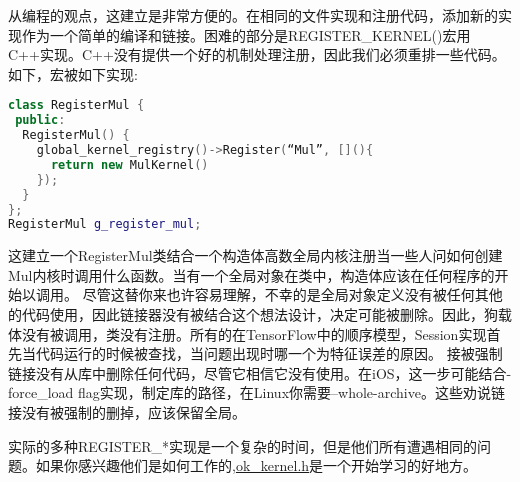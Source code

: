 从编程的观点，这建立是非常方便的。在相同的文件实现和注册代码，添加新的实现作为一个简单的编译和链接。困难的部分是REGISTER\_KERNEL()宏用C++实现。C++没有提供一个好的机制处理注册，因此我们必须重排一些代码。如下，宏被如下实现:
\begin{lstlisting}[language=C++]
class RegisterMul {
 public:
  RegisterMul() {
    global_kernel_registry()->Register(“Mul”, [](){
      return new MulKernel()
    });
  }
};
RegisterMul g_register_mul;
\end{lstlisting}
这建立一个RegisterMul类结合一个构造体高数全局内核注册当一些人问如何创建Mul内核时调用什么函数。当有一个全局对象在类中，构造体应该在任何程序的开始以调用。
尽管这替你来也许容易理解，不幸的是全局对象定义没有被任何其他的代码使用，因此链接器没有被结合这个想法设计，决定可能被删除。因此，狗载体没有被调用，类没有注册。所有的在TensorFlow中的顺序模型，Session实现首先当代码运行的时候被查找，当问题出现时哪一个为特征误差的原因。
接被强制链接没有从库中删除任何代码，尽管它相信它没有使用。在iOS，这一步可能结合-force\_load flag实现，制定库的路径，在Linux你需要--whole-archive。这些劝说链接没有被强制的删掉，应该保留全局。

实际的多种REGISTER\_*实现是一个复杂的时间，但是他们所有遭遇相同的问题。如果你感兴趣他们是如何工作的,\href{https://github.com/tensorflow/tensorflow/blob/master/tensorflow/core/framework/op_kernel.h#L1091}{ok\_kernel.h}是一个开始学习的好地方。













